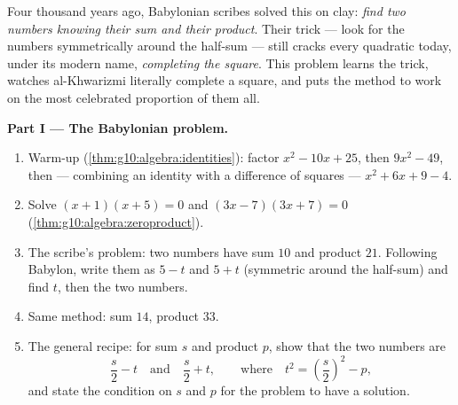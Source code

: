 \begin{problem}[{Weekend problem --- sum-and-product problems,
completing the square the way al-Khwarizmi drew it, and the
equation $x^2 = x + 1$}]
\label{pb:g10:algebra:1}
Four thousand years ago, Babylonian scribes solved this on clay:
\emph{find two numbers knowing their sum and their product}. Their
trick --- look for the numbers symmetrically around the
half-sum --- still cracks every quadratic  today, under
its modern name, \emph{completing the square}. This problem
learns the trick, watches al-Khwarizmi literally complete a
square, and puts the method to work on the most celebrated
proportion of them all.

\medskip
\noindent\textbf{Part I --- The Babylonian problem.}
\begin{enumerate}
  \item Warm-up (\cref{thm:g10:algebra:identities}): factor
        $x^2 - 10x + 25$, then $9x^2 - 49$, then --- combining an
        identity with a difference of squares ---
        $x^2 + 6x + 9 - 4$.
  \item Solve $(x + 1)(x + 5) = 0$ and
        $(3x - 7)(3x + 7) = 0$
        (\cref{thm:g10:algebra:zeroproduct}).
  \item The scribe's problem: two numbers have sum $10$ and
        product $21$. Following Babylon, write them as $5 - t$
        and $5 + t$ (symmetric around the half-sum) and find $t$,
        then the two numbers.
  \item Same method: sum $14$, product $33$.
  \item The general recipe: for sum $s$ and product $p$, show
        that the two numbers are
        \[
        \frac s2 - t
        \quad\text{and}\quad
        \frac s2 + t,
        \qquad\text{where}\quad
        t^2 = \left(\frac s2\right)^2 - p ,
        \]
        and state the condition on $s$ and $p$ for the problem to
        have a solution.
\end{enumerate}


\end{problem}
